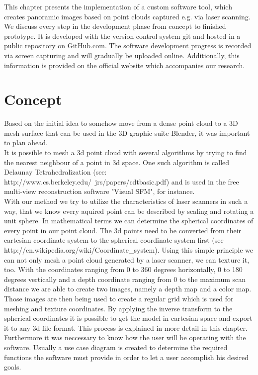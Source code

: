 This chapter presents the implementation of a custom software tool, which creates panoramic images based on point clouds captured e.g. via laser scanning. We discuss every step in the development phase from concept to finished prototype. It is developed with the version control system git and hosted in a public repository on GitHub.com. The software development progress is recorded via screen capturing and will gradually be uploaded online. Additionally, this information is provided on the official website which accompanies our research.

\section{Concept}

Based on the initial idea to somehow move from a dense point cloud to a 3D mesh surface that can be used in the 3D graphic suite Blender, it was important to plan ahead.\\
It is possible to mesh a 3d point cloud with several algorithms by trying to find the nearest neighbour of a point in 3d space. One such algorithm is called Delaunay Tetrahedralization  (see: http://www.cs.berkeley.edu/~jrs/papers/cdtbasic.pdf) and is used in the free multi-view reconstruction software "Visual SFM", for instance.\\
With our method we try to utilize the characteristics of laser scanners in such a way, that we know every aquired point can be described by scaling and rotating a unit sphere. In mathematical terms we can determine the spherical coordinates of every point in our point cloud. The 3d points need to be converted from their cartesian coordinate system to the spherical coordinate system first (see  http://en.wikipedia.org/wiki/Coordinate\_system). Using this simple principle we can not only mesh a point cloud generated by a laser scanner, we can texture it, too. With the coordinates ranging from 0 to 360 degrees horizontally, 0 to 180 degrees vertically and a depth coordinate ranging from 0 to the maximum scan distance we are able to create two images, namely a depth map and a color map. Those images are then being used to create a regular grid which is used for meshing and texture coordinates. By applying the inverse transform to the spherical coordinates it is possible to get the model in cartesian space and export it to any 3d file format. This process is explained in more detail in this chapter.\\
Furthermore it was neccessary to know how the user will be operating with the software. Usually a use case diagram is created to determine the required functions the software must provide in order to let a user accomplish his desired goals.

